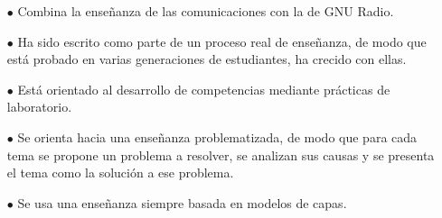 \begin{itemize}
	\item [$\bullet$]  Combina la enseñanza de las comunicaciones con la de GNU Radio.
	\item [$\bullet$] Ha sido escrito como parte de un proceso real de enseñanza, de modo que está probado en varias generaciones de estudiantes, ha crecido con ellas.
	\item [$\bullet$] Está orientado al desarrollo de competencias mediante prácticas de laboratorio.
	\item [$\bullet$] Se orienta hacia una enseñanza problematizada, de modo que para cada tema se propone un problema a resolver, se analizan sus causas y se presenta el tema como la solución a ese problema.
	\item [$\bullet$] Se usa una enseñanza siempre basada en modelos de capas.
\end{itemize}
